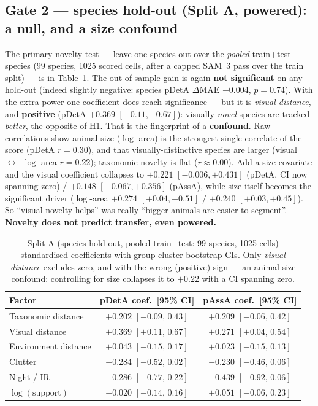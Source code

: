 \documentclass[11pt]{article}
\newcommand{\pdeta}{\textsf{pDetA}}
\newcommand{\passa}{\textsf{pAssA}}
\begin{document}
\subsection{Gate 2 --- species hold-out (Split A, powered): a null, and a size confound}
The primary novelty test --- leave-one-species-out over the \emph{pooled} train+test species (99 species,
1025 scored cells, after a capped SAM~3 pass over the train split) --- is in Table~\ref{tab:coefA}. The
out-of-sample gain is again \textbf{not significant} on any hold-out (indeed slightly negative: species
\pdeta{} $\Delta$MAE $-0.004$, $p=0.74$). With the extra power one coefficient does reach significance ---
but it is \emph{visual distance}, and \textbf{positive} (\pdeta{} $+0.369$ $[+0.11, +0.67]$): visually
\emph{novel} species are tracked \emph{better}, the opposite of H1. That is the fingerprint of a
\textbf{confound}. Raw correlations show animal size ($\log$-area) is the strongest single correlate of the
score (\pdeta{} $r=0.30$), and that visually-distinctive species are larger
(visual~$\leftrightarrow$~$\log$-area $r=0.22$); taxonomic novelty is flat ($r\approx0.00$). Add a size
covariate and the visual coefficient collapses to $+0.221$ $[-0.006, +0.431]$ (\pdeta{}, CI now spanning
zero) / $+0.148$ $[-0.067, +0.356]$ (\passa{}), while size itself becomes the significant driver
($\log$-area $+0.274$ $[+0.04, +0.51]$ / $+0.240$ $[+0.03, +0.45]$). So ``visual novelty helps'' was really
``bigger animals are easier to segment''. \textbf{Novelty does not predict transfer, even powered.}

\begin{table}[h]
\centering
\small
\begin{tabular}{lcc}
\toprule
Factor & \pdeta{} coef.\ [95\% CI] & \passa{} coef.\ [95\% CI] \\
\midrule
Taxonomic distance   & $+0.202$ $[-0.09,\,0.43]$ & $+0.209$ $[-0.06,\,0.42]$ \\
Visual distance      & $+0.369$ $[+0.11,\,0.67]$ & $+0.271$ $[+0.04,\,0.54]$ \\
Environment distance & $+0.043$ $[-0.15,\,0.17]$ & $+0.023$ $[-0.15,\,0.13]$ \\
Clutter              & $-0.284$ $[-0.52,\,0.02]$ & $-0.230$ $[-0.46,\,0.06]$ \\
Night / IR           & $-0.286$ $[-0.77,\,0.22]$ & $-0.439$ $[-0.92,\,0.06]$ \\
$\log(\text{support})$ & $-0.020$ $[-0.14,\,0.16]$ & $+0.051$ $[-0.06,\,0.23]$ \\
\bottomrule
\end{tabular}
\caption{Split A (species hold-out, pooled train+test: 99 species, 1025 cells) standardised coefficients
with group-cluster-bootstrap CIs. Only \emph{visual distance} excludes zero, and with the wrong (positive)
sign --- an animal-size confound: controlling for size collapses it to $+0.22$ with a CI spanning zero.}
\label{tab:coefA}
\end{table}
\end{document}
